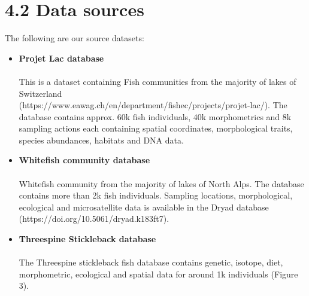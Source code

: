 \documentclass[11pt]{article}
\begin{document}
\section*{4.2 Data sources}
The following are our source datasets:\\
\begin{itemize}
\item {\bf Projet Lac database}\\
\\
This is a dataset containing Fish communities from the majority of
lakes of Switzerland\\
(https://www.eawag.ch/en/department/fishec/projects/projet-lac/). The
database contains approx. 60k fish individuals, 40k morphometrics and
8k sampling actions each containing spatial coordinates, morphological
traits, species abundances, habitats and DNA data.
\\
\item {\bf Whitefish community database}\\
\\
Whitefish community from the majority of lakes of North Alps.  The
database contains more than 2k fish individuals. Sampling locations,
morphological, ecological and microsatellite data is available in the
Dryad database (https://doi.org/10.5061/dryad.k183ft7).
\\
\item {\bf Threespine Stickleback database}\\
\\
The Threespine stickleback fish database contains genetic, isotope,
diet, morphometric, ecological and spatial data for around 1k
individuals (Figure 3).
\end{itemize}

\end{document}
